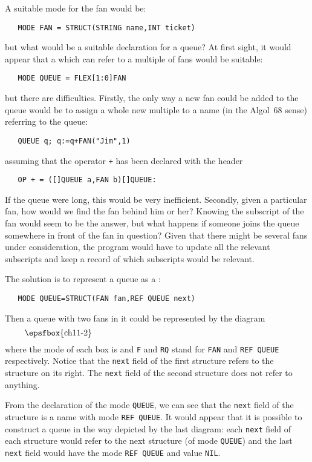 A suitable mode for the fan would be:
\begin{verbatim}
   MODE FAN = STRUCT(STRING name,INT ticket)
\end{verbatim}
\noindent
but what would be a suitable declaration for a queue? At first sight,
it would appear that a  which can
refer to a multiple of fans would be suitable:
\begin{verbatim}
   MODE QUEUE = FLEX[1:0]FAN
\end{verbatim}
\noindent
but there are difficulties. Firstly, the only way a new fan could be
added to the queue would be to assign a whole new multiple to a name
(in the Algol~68 sense) referring to the queue:
\begin{verbatim}
   QUEUE q; q:=q+FAN("Jim",1)
\end{verbatim}
\noindent
assuming that the operator \verb|+| has been declared with the header
\begin{verbatim}
   OP + = ([]QUEUE a,FAN b)[]QUEUE:
\end{verbatim}
\noindent
If the queue were long, this would be very inefficient. Secondly, given
a particular fan, how would we find the fan behind him or her? Knowing
the subscript of the fan would seem to be the answer, but what happens
if someone joins the queue somewhere in front of the fan in question?
Given that there might be several fans under consideration, the program
would have to update all the relevant subscripts and keep a record of
which subscripts would be relevant.

The solution is to represent a queue as a
:
\begin{verbatim}
   MODE QUEUE=STRUCT(FAN fan,REF QUEUE next)
\end{verbatim}
\noindent
Then a queue with two fans in it could be represented by the diagram
$$\vbox{\epsfbox{ch11-2}}$$
where the mode of each box is  and
\verb|F| and \verb|RQ| stand for \verb|FAN| and \verb|REF QUEUE|
respectively.  Notice that the \verb|next| field of the first structure
refers to the structure on its right.  The \verb|next| field of the
second structure does not refer to anything.

From the declaration of the mode \verb|QUEUE|, we can see that the
\verb|next| field of the structure is a name with mode
\verb|REF QUEUE|. It would appear that it is possible to construct a
queue in the way depicted by the last diagram: each \verb|next| field
of each structure would refer to the next structure (of mode
\verb|QUEUE|) and the last \verb|next| field would have the mode
\verb|REF QUEUE| and value \verb|NIL|.

